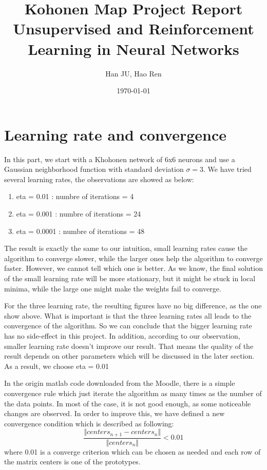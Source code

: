 \documentclass[a4paper, 12pt]{article}
\title{Kohonen Map Project Report \\ \vspace{0.5cm} \large Unsupervised and Reinforcement Learning in Neural Networks}
\author{Han JU, Hao Ren}
\date{\today}
\begin{document}
\maketitle
\section{Learning rate and convergence}
In this part, we start with a Khohonen network of 6x6 neurons and use a Gaussian neighborhood function with standard deviation $\sigma = 3$.
We have tried several learning rates, the observations are showed as below:
\begin{enumerate}
\item eta = 0.01 : numbre of iterations = 4
\item eta = 0.001 : numbre of iterations = 24
\item eta = 0.0001 : numbre of iterations = 48
\end{enumerate}

The result is exactly the same to our intuition, small learning rates cause the algorithm to converge slower, while the larger ones help the algorithm to converge faster. However, we cannot tell which one is better. As we know, the final solution of the small learning rate will be more stationary, but it might be stuck in local minima, while the large one might make the weights fail to converge.

For the three learning rate, the resulting figures have no big difference, as the one show above. What is important is that the three learning rates all leads to the convergence of the algorithm. So we can conclude that the bigger learning rate has no side-effect in this project. In addition, according to our observation, smaller learning rate doesn't improve our result. That means the quality of the result depends on other parameters which will be discussed in the later section. As a result, we choose eta = 0.01

In the origin matlab code downloaded from the Moodle, there is a
simple convergence rule which just iterate the algorithm as many times
as the number of the data points. In most of the case, it is not good enough, as some noticeable changes are observed. In order to improve this, we have defined a new convergence condition which is described as following:
\begin{equation}
  \frac{\Vert centers_{n+1} - centers_n\Vert}{\Vert centers_n \Vert}
  < 0.01
\end{equation}
where 0.01 is a converge criterion which can be chosen as needed and each row of the matrix centers is one of the prototypes.
\end{document}

